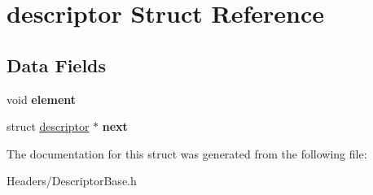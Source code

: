 \hypertarget{structdescriptor}{\section{descriptor Struct Reference}
\label{structdescriptor}
}
\subsection*{Data Fields}
\begin{DoxyCompactItemize}
\item 
\hypertarget{structdescriptor_a5d099b8fda669eea5c5fbd9cd8fd5a7f}{void {\bfseries element}}\label{structdescriptor_a5d099b8fda669eea5c5fbd9cd8fd5a7f}

\item 
\hypertarget{structdescriptor_af629e5c0090b88120fb8b2831c3e6f2a}{struct \hyperlink{structdescriptor}{descriptor} $\ast$ {\bfseries next}}\label{structdescriptor_af629e5c0090b88120fb8b2831c3e6f2a}

\end{DoxyCompactItemize}


The documentation for this struct was generated from the following file\-:\begin{DoxyCompactItemize}
\item 
Headers/Descriptor\-Base.\-h\end{DoxyCompactItemize}
